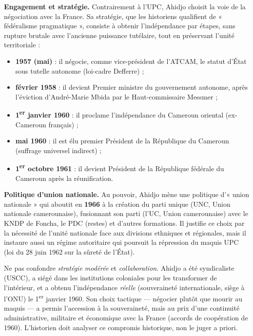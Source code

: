 \documentclass[11pt]{article}
\newcommand{\cle}[1]{{\popxbold\color{popdark}#1}}
\begin{document}
\textbf{Engagement et stratégie.} Contrairement à l'UPC, Ahidjo choisit la voie de la \cle{négociation} avec la France. Sa stratégie, que les historiens qualifient de « fédéralisme pragmatique », consiste à obtenir l'indépendance par étapes, sans rupture brutale avec l'ancienne puissance tutélaire, tout en préservant l'unité territoriale :
\begin{itemize}
\item \textbf{1957 (mai)} : il négocie, comme vice-président de l'ATCAM, le statut d'\cle{État sous tutelle autonome} (loi-cadre Defferre) ;
\item \textbf{février 1958} : il devient \cle{Premier ministre} du gouvernement autonome, après l'éviction d'André-Marie Mbida par le Haut-commissaire Messmer ;
\item \textbf{1\textsuperscript{er} janvier 1960} : il proclame l'indépendance du Cameroun oriental (ex-Cameroun français) ;
\item \textbf{mai 1960} : il est élu premier Président de la République du Cameroun (suffrage universel indirect) ;
\item \textbf{1\textsuperscript{er} octobre 1961} : il devient Président de la \cle{République fédérale du Cameroun} après la réunification.
\end{itemize}

\textbf{Politique d'union nationale.} Au pouvoir, Ahidjo mène une politique d'« union nationale » qui aboutit en \textbf{1966} à la création du \cle{parti unique} (UNC, Union nationale camerounaise), fusionnant son parti (l'UC, Union camerounaise) avec le KNDP de Foncha, le PDC (restes) et d'autres formations. Il justifie ce choix par la nécessité de l'unité nationale face aux divisions ethniques et régionales, mais il instaure aussi un régime autoritaire qui poursuit la répression du maquis UPC (loi du 28 juin 1962 sur la sûreté de l'État).

\begin{attention}
Ne pas confondre \emph{stratégie modérée} et \emph{collaboration}. Ahidjo a été syndicaliste (USCC), a siégé dans les institutions coloniales pour les transformer de l'intérieur, et a obtenu l'indépendance \emph{réelle} (souveraineté internationale, siège à l'ONU) le 1\textsuperscript{er} janvier 1960. Son choix tactique — négocier plutôt que mourir au maquis — a permis l'accession à la souveraineté, mais au prix d'une continuité administrative, militaire et économique avec la France (accords de coopération de 1960). L'historien doit analyser ce \cle{compromis historique}, non le juger a priori.
\end{attention}
\end{document}

